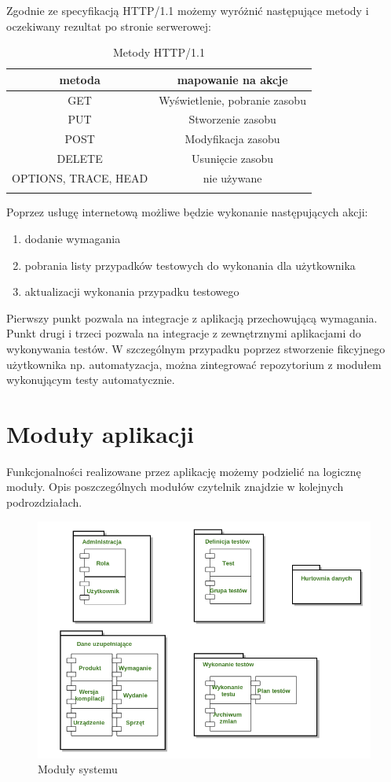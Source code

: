 Zgodnie ze specyfikacją HTTP/1.1 możemy wyróżnić następujące metody i oczekiwany rezultat po stronie serwerowej:

\renewcommand\multirowsetup{\centering\arraybackslash}
\begin{longtable}{|c|c|}
\hline
\textbf{metoda} & \textbf{mapowanie na akcje} \\ \hline
GET & Wyświetlenie, pobranie zasobu \\ \hline
PUT & Stworzenie zasobu \\ \hline
POST & Modyfikacja zasobu \\ \hline
DELETE & Usunięcie zasobu \\ \hline
OPTIONS, TRACE, HEAD & nie używane \\ \hline

\caption{Metody HTTP/1.1 \cite{http}}
\end{longtable}

Poprzez usługę internetową możliwe będzie wykonanie następujących akcji:
\begin{enumerate}
  \item dodanie wymagania
  \item pobrania listy przypadków testowych do wykonania dla użytkownika
  \item aktualizacji wykonania przypadku testowego
\end{enumerate}
Pierwszy punkt pozwala na integracje z aplikacją przechowującą wymagania. Punkt drugi i trzeci pozwala na integracje z zewnętrznymi aplikacjami do wykonywania testów. W szczególnym przypadku poprzez stworzenie fikcyjnego użytkownika np. automatyzacja, można zintegrować repozytorium z modułem wykonującym testy automatycznie.


\section{Moduły aplikacji}
Funkcjonalności realizowane przez aplikację możemy podzielić na logicznę moduły. Opis poszczególnych modułów czytelnik znajdzie w kolejnych podrozdziałach.
\begin{figure}[h]
\centerline{\includegraphics[scale=0.5]{img/komponenty.png}}
\caption{Moduły systemu}
\label{fig:moduly}
\end{figure}

